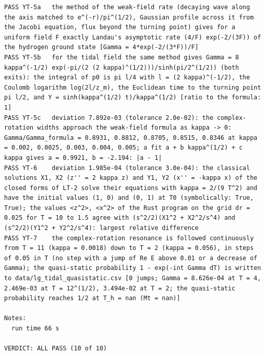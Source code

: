 \documentclass[
  10pt,
]{article}
\begin{document}
\begin{verbatim}
PASS YT-5a   the method of the weak-field rate (decaying wave along the axis matched to e^(-r)/pi^(1/2), Gaussian profile across it from the Jacobi equation, flux beyond the turning point) gives for a uniform field F exactly Landau's asymptotic rate (4/F) exp(-2/(3F)) of the hydrogen ground state [Gamma = 4*exp(-2/(3*F))/F]
PASS YT-5b   for the tidal field the same method gives Gamma = 8 kappa^(-1/2) exp(-pi/(2 (2 kappa)^(1/2)))/sinh(pi/2^(1/2)) (both exits): the integral of p0 is pi l/4 with l = (2 kappa)^(-1/2), the Coulomb logarithm log(2l/z_m), the Euclidean time to the turning point pi l/2, and Y = sinh(kappa^(1/2) t)/kappa^(1/2) [ratio to the formula: 1]
PASS YT-5c   deviation 7.892e-03 (tolerance 2.0e-02): the complex-rotation widths approach the weak-field formula as kappa -> 0: Gamma/Gamma_formula = 0.8931, 0.8812, 0.8705, 0.8515, 0.8346 at kappa = 0.002, 0.0025, 0.003, 0.004, 0.005; a fit a + b kappa^(1/2) + c kappa gives a = 0.9921, b = -2.194: |a - 1|
PASS YT-6    deviation 1.985e-04 (tolerance 3.0e-04): the classical solutions X1, X2 (z'' = 2 kappa z) and Y1, Y2 (x'' = -kappa x) of the closed forms of LT-2 solve their equations with kappa = 2/(9 T^2) and have the initial values (1, 0) and (0, 1) at T0 (symbolically: True, True); the values <z^2>, <x^2> of the Rust program on the grid dr = 0.025 for T = 10 to 1.5 agree with (s^2/2)(X1^2 + X2^2/s^4) and (s^2/2)(Y1^2 + Y2^2/s^4): largest relative difference
PASS YT-7    the complex-rotation resonance is followed continuously from T = 11 (kappa = 0.0018) down to T = 2 (kappa = 0.056), in steps of 0.05 in T (no step with a jump of Re E above 0.01 or a decrease of Gamma); the quasi-static probability 1 - exp(-int Gamma dT) is written to data/lg_tidal_quasistatic.csv [0 jumps; Gamma = 8.626e-04 at T = 4, 2.469e-03 at T = 12^(1/2), 3.494e-02 at T = 2; the quasi-static probability reaches 1/2 at T_h = nan (Mt = nan)]

Notes:
  run time 66 s

VERDICT: ALL PASS (10 of 10)
\end{verbatim}
\end{document}
